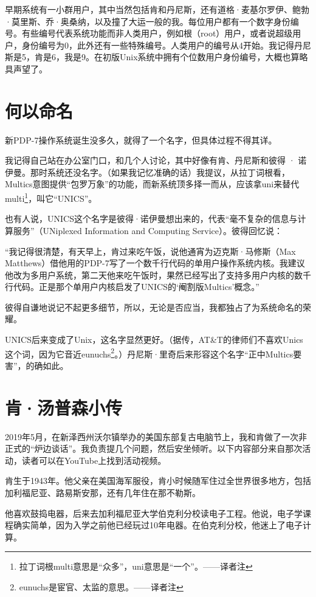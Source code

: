 \documentclass[a4paper,12pt,UTF8,twoside]{ctexbook}
\begin{document}
早期系统有一小群用户，其中当然包括肯和丹尼斯，还有道格·麦基尔罗伊、鲍勃·莫里斯、乔·奥桑纳，以及撞了大运一般的我。每位用户都有一个数字身份编号。有些编号代表系统功能而非人类用户，例如根（root）用户，或者说超级用户，身份编号为0，此外还有一些特殊编号。人类用户的编号从4开始。我记得丹尼斯是5，肯是6，我是9。在初版Unix系统中拥有个位数用户身份编号，大概也算略具声望了。

\section{何以命名}

新PDP-7操作系统诞生没多久，就得了一个名字，但具体过程不得其详。

我记得自己站在办公室门口，和几个人讨论，其中好像有肯、丹尼斯和彼得 · 诺伊曼。那时系统还没名字。（如果我记忆准确的话）我提议，从拉丁词根看，Multics意图提供“包罗万象”的功能，而新系统顶多择一而从，应该拿uni来替代multi\footnote{拉丁词根multi意思是“众多”，uni意思是“一个”。——译者注}，叫它“UNICS”。

也有人说，UNICS这个名字是彼得·诺伊曼想出来的，代表“毫不复杂的信息与计算服务”（UNiplexed Information and Computing Service）。彼得回忆说：

“我记得很清楚，有天早上，肯过来吃午饭，说他通宵为迈克斯·马修斯（Max Matthews）借他用的PDP-7写了一个数千行代码的单用户操作系统内核。我建议他改为多用户系统，第二天他来吃午饭时，果然已经写出了支持多用户内核的数千行代码。正是那个单用户内核启发了UNICS的‘阉割版Multics’概念。”

彼得自谦地说记不起更多细节，所以，无论是否应当，我都独占了为系统命名的荣耀。

UNICS后来变成了Unix，这名字显然更好。（据传，AT\&T的律师们不喜欢Unics这个词，因为它音近eunuchs\footnote{eunuchs是宦官、太监的意思。——译者注}。）丹尼斯·里奇后来形容这个名字“正中Multics要害”，的确如此。

\section{肯·汤普森小传}

2019年5月，在新泽西州沃尔镇举办的美国东部复古电脑节上，我和肯做了一次非正式的“炉边谈话”。我负责提几个问题，然后安坐倾听。以下内容部分来自那次活动，读者可以在YouTube上找到活动视频。

肯生于1943年。他父亲在美国海军服役，肯小时候随军住过全世界很多地方，包括加利福尼亚、路易斯安那，还有几年住在那不勒斯。

他喜欢鼓捣电器，后来去加利福尼亚大学伯克利分校读电子工程。他说，电子学课程确实简单，因为入学之前他已经玩过10年电器。在伯克利分校，他迷上了电子计算。
\end{document}
